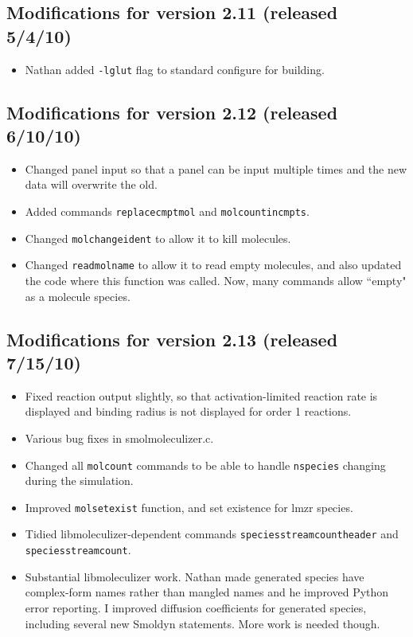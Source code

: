 \documentclass {scrbook}
\newcommand {\ttt} {\texttt}
\begin{document}
\subsection{Modifications for version 2.11 (released 5/4/10)}
\begin{itemize}
\item Nathan added \ttt{-lglut} flag to standard configure for building.
\end{itemize}

\subsection{Modifications for version 2.12 (released 6/10/10)}
\begin{itemize}
\item Changed panel input so that a panel can be input multiple times and the new data will overwrite the old.
\item Added commands \ttt{replacecmptmol} and \ttt{molcountincmpts}.
\item Changed \ttt{molchangeident} to allow it to kill molecules.
\item Changed \ttt{readmolname} to allow it to read empty molecules, and also updated the code where this function was called. Now, many commands allow ``empty" as a molecule species.
\end{itemize}

\subsection{Modifications for version 2.13 (released 7/15/10)}
\begin{itemize}
\item Fixed reaction output slightly, so that activation-limited reaction rate is displayed and binding radius is not displayed for order 1 reactions.
\item Various bug fixes in smolmoleculizer.c.
\item Changed all \ttt{molcount} commands to be able to handle \ttt{nspecies} changing during the simulation.
\item Improved \ttt{molsetexist} function, and set existence for lmzr species.
\item Tidied libmoleculizer-dependent commands \ttt{speciesstreamcountheader} and \ttt{speciesstreamcount}.
\item Substantial libmoleculizer work. Nathan made generated species have complex-form names rather than mangled names and he improved Python error reporting. I improved diffusion coefficients for generated species, including several new Smoldyn statements. More work is needed though.
\end{itemize}
\end{document}
